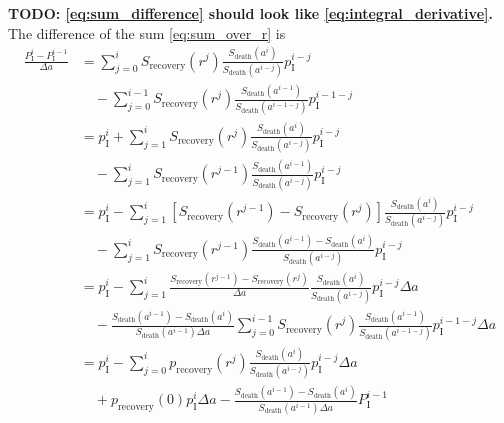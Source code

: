 \documentclass[12pt]{article}
\begin{document}
\textbf{TODO: \eqref{eq:sum_difference} should look like
  \eqref{eq:integral_derivative}.}
%
The difference of the sum \eqref{eq:sum_over_r} is
\begin{equation}
  \label{eq:sum_difference}
  \begin{split}
    \frac{P_{\mathrm{I}}^i - P_{\mathrm{I}}^{i - 1}}{\Delta a}
    &=
    \sum_{j = 0}^i S_{\text{recovery}}(r^j)
    \frac{S_{\text{death}}(a^i)}{S_{\text{death}}(a^{i - j})}
    p_{\mathrm{I}}^{i - j}
    \\ & \quad {}
    - \sum_{j = 0}^{i - 1} S_{\text{recovery}}(r^j)
    \frac{S_{\text{death}}(a^{i - 1})}{S_{\text{death}}(a^{i - 1 - j})}
    p_{\mathrm{I}}^{i - 1 - j}
    \\
    &= p_{\mathrm{I}}^i
    + \sum_{j = 1}^i S_{\text{recovery}}(r^j)
    \frac{S_{\text{death}}(a^i)}{S_{\text{death}}(a^{i - j})}
    p_{\mathrm{I}}^{i - j}
    \\ & \quad {}
    - \sum_{j = 1}^i S_{\text{recovery}}(r^{j - 1})
    \frac{S_{\text{death}}(a^{i - 1})}{S_{\text{death}}(a^{i - j})}
    p_{\mathrm{I}}^{i - j}
    \\
    &= p_{\mathrm{I}}^i
    - \sum_{j = 1}^i \left[
      S_{\text{recovery}}(r^{j - 1})
      - S_{\text{recovery}}(r^j)
    \right]
    \frac{S_{\text{death}}(a^i)}{S_{\text{death}}(a^{i - j})}
    p_{\mathrm{I}}^{i - j}
    \\ & \quad {}
    - \sum_{j = 1}^i S_{\text{recovery}}(r^{j - 1})
    \frac{S_{\text{death}}(a^{i - 1}) - S_{\text{death}}(a^i)}
    {S_{\text{death}}(a^{i - j})}
    p_{\mathrm{I}}^{i - j}
    \\
    &= p_{\mathrm{I}}^i
    - \sum_{j = 1}^i
    \frac{S_{\text{recovery}}(r^{j - 1}) - S_{\text{recovery}}(r^j)}
    {\Delta a}
    \frac{S_{\text{death}}(a^i)}{S_{\text{death}}(a^{i - j})}
    p_{\mathrm{I}}^{i - j} \Delta a
    \\ & \quad {}
    -
    \frac{S_{\text{death}}(a^{i - 1}) - S_{\text{death}}(a^i)}
    {S_{\text{death}}(a^{i - 1}) \Delta a}
    \sum_{j = 0}^{i - 1} S_{\text{recovery}}(r^j)
    \frac{S_{\text{death}}(a^{i - 1})}{S_{\text{death}}(a^{i - 1 - j})}
    p_{\mathrm{I}}^{i - 1 - j} \Delta a
    \\
    &= p_{\mathrm{I}}^i
    - \sum_{j = 0}^i p_{\text{recovery}}(r^j)
    \frac{S_{\text{death}}(a^i)}{S_{\text{death}}(a^{i - j})}
    p_{\mathrm{I}}^{i - j} \Delta a
    \\ & \quad {}
    + p_{\text{recovery}}(0) p_{\mathrm{I}}^i \Delta a
    - \frac{S_{\text{death}}(a^{i - 1}) - S_{\text{death}}(a^i)}
    {S_{\text{death}}(a^{i - 1}) \Delta a}
    P_{\mathrm{I}}^{i - 1}
  \end{split}
\end{equation}
\end{document}
